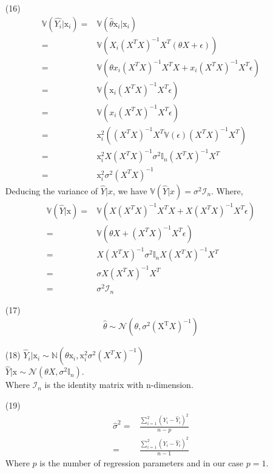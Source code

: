 \documentclass[12pt,a4paper]{article}
\begin{document}
\begin{enumerate}
              
       \item[(16)] 
       \begin{align*}
            \mathbb{V}(\hat{Y_i}|\mathrm{x}_i)=& \mathbb{V}(\hat{\theta} \mathrm{x}_i|\mathrm{x}_i)\\
            =&\mathbb{V}(X_i(X^TX)^{-1}X^T(\theta X+\epsilon))\\
            =&\mathbb{V}(\theta x_i(X^TX)^{-1}X^TX + x_i(X^TX)^{-1}X^T\epsilon)\\
            =&\mathbb{V}(\mathrm{x}_i(X^TX)^{-1}X^T\epsilon)\\
            =& \mathbb{V}(x_i(X^TX)^{-1}X^T\epsilon)\\
            =& \mathrm{x}_i^2((X^TX)^{-1}X^T \mathbb{V}(\epsilon)(X^TX)^{-1}X^T)\\
            =& \mathrm{x}_i^2X(X^TX)^{-1} \sigma^2 \mathbb{I}_n(X^TX)^{-1}X^T\\
            =& \mathrm{x}_i^2  \sigma^2(X^TX)^{-1}
       \end{align*}
     Deducing the variance of $\hat{Y}|x$, we have $\mathbb{V}(\hat{Y}|x)=\sigma^2\mathcal{I}_n$.
     Where,\begin{align*}
         \mathbb{V}(\hat{Y}|\mathrm{x})=& \mathbb{V}(X(X^TX)^{-1}X^TX+X(X^TX)^{-1}X^T\epsilon)\\
         =& \mathbb{V}(\theta X+(X^TX)^{-1}X^T\epsilon)\\
         =& X(X^TX)^{-1} \sigma^2 \mathbb{I}_n X(X^TX)^{-1}X^T\\
         =& \sigma X(X^TX)^{-1} X^T\\
         =& \sigma^2 \mathcal{I}_n
     \end{align*}
     
     \item[(17)] 
         \begin{align*}
             \hat{\theta}\sim \mathcal{N}\left(\theta,\sigma ^2 (\mathrm{X}^{\text{T}}X)^{-1}\right)
         \end{align*}
     \item[(18)] 
         $\hat{Y}_i|\mathrm{x}_i \sim \mathbb{N}\left(\theta \mathrm{x}_i,\mathrm{x}_i^2 \sigma^2(X^TX)^{-1} \right) $\\
         $\hat{Y}|\mathrm{x} \sim \mathcal{N}\left(\theta X, \sigma ^2 \mathbb{I}_n\right)$.\\
         Where $\mathcal{I}_n$ is the identity matrix with n-dimension.
    \item[(19)] 
         \begin{align*}
             \hat{\sigma}^2 = & \frac{\sum_{i=1}^2(Y_i-\hat{Y}_i)^2}{n-p}\\
             =& \frac{\sum_{i=1}^2(Y_i-\hat{Y}_i)^2}{n-1}
         \end{align*}
         Where $p$ is the number of regression parameters and in our case $p=1$.
         

\end{enumerate}
\end{document}
